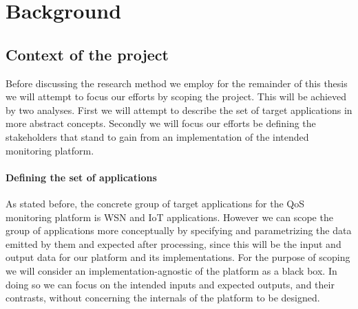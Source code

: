 \chapter{Background}
\label{ch:back}
\section{Context of the project}
\label{sec:back:context}
Before discussing the research method we employ for the remainder of this thesis we will attempt to focus our efforts by scoping the project. This will be achieved by two analyses. First we will attempt to describe the set of target applications in more abstract concepts. Secondly we will focus our efforts be defining the stakeholders that stand to gain from an implementation of the intended monitoring platform. 

\subsubsection*{Defining the set of applications}
As stated before, the concrete group of target applications for the QoS monitoring platform is WSN and IoT applications. However we can scope the group of applications more conceptually by specifying and parametrizing the data emitted by them and expected after processing, since this will be the input and output data for our platform and its implementations. For the purpose of scoping we will consider an implementation-agnostic  of the platform as a black box. In doing so we can focus on the intended inputs and expected outputs, and their contrasts, without concerning the internals of the platform to be designed.

